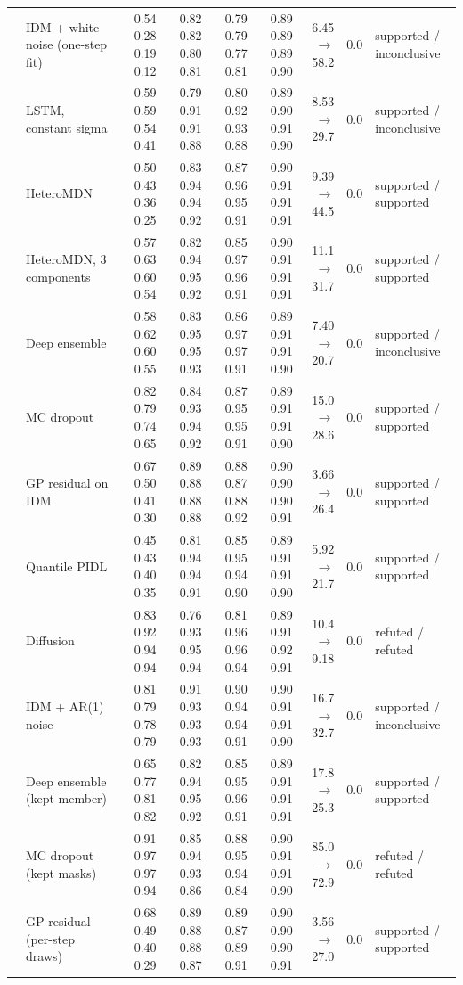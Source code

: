 \begin{longtable}{llrrrrrrl}
 & IDM + white noise (one-step fit) & 0.54 0.28 0.19 0.12 & 0.82 0.82 0.80 0.81 & 0.79 0.79 0.77 0.81 & 0.89 0.89 0.89 0.90 & 6.45 $\rightarrow$ 58.2 & 0.0 & supported / inconclusive \\
 & LSTM, constant sigma & 0.59 0.59 0.54 0.41 & 0.79 0.91 0.91 0.88 & 0.80 0.92 0.93 0.88 & 0.89 0.90 0.91 0.90 & 8.53 $\rightarrow$ 29.7 & 0.0 & supported / inconclusive \\
 & HeteroMDN & 0.50 0.43 0.36 0.25 & 0.83 0.94 0.94 0.92 & 0.87 0.96 0.95 0.91 & 0.90 0.91 0.91 0.91 & 9.39 $\rightarrow$ 44.5 & 0.0 & supported / supported \\
 & HeteroMDN, 3 components & 0.57 0.63 0.60 0.54 & 0.82 0.94 0.95 0.92 & 0.85 0.97 0.96 0.91 & 0.90 0.91 0.91 0.91 & 11.1 $\rightarrow$ 31.7 & 0.0 & supported / supported \\
 & Deep ensemble & 0.58 0.62 0.60 0.55 & 0.83 0.95 0.95 0.93 & 0.86 0.97 0.97 0.91 & 0.89 0.91 0.91 0.90 & 7.40 $\rightarrow$ 20.7 & 0.0 & supported / inconclusive \\
 & MC dropout & 0.82 0.79 0.74 0.65 & 0.84 0.93 0.94 0.92 & 0.87 0.95 0.95 0.91 & 0.89 0.91 0.91 0.90 & 15.0 $\rightarrow$ 28.6 & 0.0 & supported / supported \\
 & GP residual on IDM & 0.67 0.50 0.41 0.30 & 0.89 0.88 0.88 0.88 & 0.88 0.87 0.88 0.92 & 0.90 0.90 0.90 0.91 & 3.66 $\rightarrow$ 26.4 & 0.0 & supported / supported \\
 & Quantile PIDL & 0.45 0.43 0.40 0.35 & 0.81 0.94 0.94 0.91 & 0.85 0.95 0.94 0.90 & 0.89 0.91 0.91 0.90 & 5.92 $\rightarrow$ 21.7 & 0.0 & supported / supported \\
 & Diffusion & 0.83 0.92 0.94 0.94 & 0.76 0.93 0.95 0.94 & 0.81 0.96 0.96 0.94 & 0.89 0.91 0.92 0.91 & 10.4 $\rightarrow$ 9.18 & 0.0 & refuted / refuted \\
 & IDM + AR(1) noise & 0.81 0.79 0.78 0.79 & 0.91 0.93 0.93 0.93 & 0.90 0.94 0.94 0.91 & 0.90 0.91 0.91 0.90 & 16.7 $\rightarrow$ 32.7 & 0.0 & supported / inconclusive \\
 & Deep ensemble (kept member) & 0.65 0.77 0.81 0.82 & 0.82 0.94 0.95 0.92 & 0.85 0.95 0.96 0.91 & 0.89 0.91 0.91 0.91 & 17.8 $\rightarrow$ 25.3 & 0.0 & supported / supported \\
 & MC dropout (kept masks) & 0.91 0.97 0.97 0.94 & 0.85 0.94 0.93 0.86 & 0.88 0.95 0.94 0.84 & 0.90 0.91 0.91 0.90 & 85.0 $\rightarrow$ 72.9 & 0.0 & refuted / refuted \\
 & GP residual (per-step draws) & 0.68 0.49 0.40 0.29 & 0.89 0.88 0.88 0.87 & 0.89 0.87 0.89 0.91 & 0.90 0.90 0.90 0.91 & 3.56 $\rightarrow$ 27.0 & 0.0 & supported / supported \\
\end{longtable}
\endgroup
